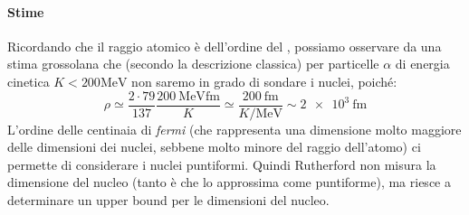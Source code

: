 \begin{itemize}
    \paragraph{Stime} Ricordando che il raggio atomico è dell'ordine del
    , possiamo osservare da una stima grossolana che (secondo la
    descrizione classica) per particelle $\alpha$ di energia cinetica
    $K<200\si{\MeV}$ non saremo in grado di sondare i nuclei, poiché:
    \begin{equation}
      \rho \simeq \frac{2\cdot 79}{137}\frac{\SI{200}{\MeV \femto\m}}{K}
      \simeq
      \frac{\SI{200}{\femto\m}}{K \si{\per \MeV}} \sim \SI{2e3}{\femto\m}
    \end{equation}
    L'ordine delle centinaia di \textit{fermi} (che rappresenta una dimensione
    molto maggiore delle dimensioni dei nuclei, sebbene molto minore del raggio
    dell'atomo) ci permette di considerare i nuclei puntiformi. Quindi
    Rutherford non misura la dimensione del nucleo (tanto è che lo approssima
    come puntiforme), ma riesce a determinare un upper bound per le dimensioni
    del nucleo.


\end{itemize}
